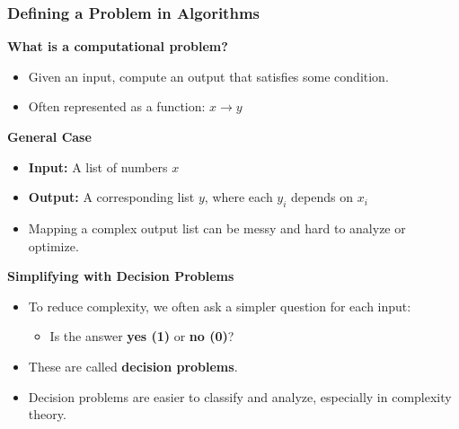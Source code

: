 \documentclass[10pt,aspectratio=43]{beamer}
\begin{document}
\begin{frame}
  \frametitle{Defining a Problem in Algorithms}

  \textbf{What is a computational problem?}
  \begin{itemize}
      \item Given an input, compute an output that satisfies some condition.
      \item Often represented as a function: $x \rightarrow y$
  \end{itemize}

  \vspace{0.3cm}

  \textbf{General Case}
  \begin{itemize}
      \item \textbf{Input:} A list of numbers $x$
      \item \textbf{Output:} A corresponding list $y$, where each $y_i$ depends on $x_i$
      \item Mapping a complex output list can be messy and hard to analyze or optimize.
  \end{itemize}

  \vspace{0.3cm}

  \textbf{Simplifying with Decision Problems}
  \begin{itemize}
      \item To reduce complexity, we often ask a simpler question for each input:
            \begin{itemize}
                \item Is the answer \textbf{yes (1)} or \textbf{no (0)}?
            \end{itemize}
      \item These are called \textbf{decision problems}.
      \item Decision problems are easier to classify and analyze, especially in complexity theory.
  \end{itemize}
\end{frame}
\end{document}
